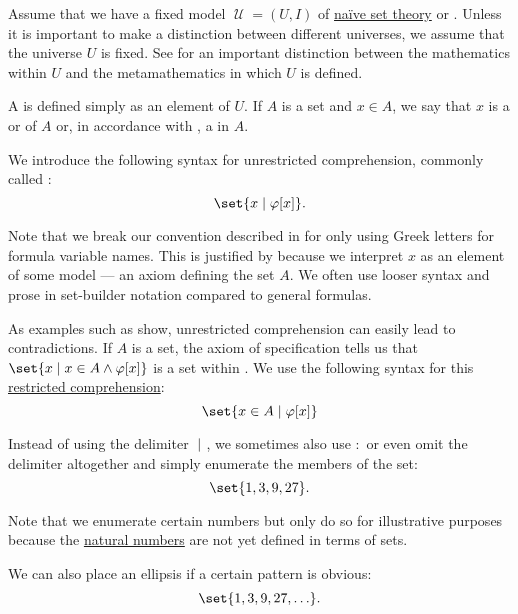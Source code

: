 \begin{definition}\label{def:set}
  Assume that we have a fixed model \( \mscrU = (U, I) \) of \hyperref[def:naive_set_theory]{na\"ive set theory} or \hyperref[def:zfc]{}.  Unless it is important to make a distinction between different universes, we assume that the universe \( U \) is fixed. See  for an important distinction between the mathematics within \( U \) and the metamathematics in which \( U \) is defined.

  A  is defined simply as an element of \( U \). If \( A \) is a set and \( x \in A \), we say that \( x \) is a  or  of \( A \) or, in accordance with , a  in \( A \).
\end{definition}

\begin{definition}\label{def:set_builder_notation}
  We introduce the following syntax for unrestricted comprehension, commonly called :
  \begin{equation*}
    \set{ x \given \varphi[x] }.
  \end{equation*}

  Note that we break our convention described in  for only using Greek letters for formula variable names. This is justified by  because we interpret \( x \) as an element of some model --- an axiom defining the set \( A \). We often use looser syntax and prose in set-builder notation compared to general formulas.

  As examples such as  show, unrestricted comprehension can easily lead to contradictions. If \( A \) is a set, the axiom of specification  tells us that \( \set{ x \given x \in A \wedge \varphi[x] } \) is a set within \hyperref[def:zfc]{}. We use the following syntax for this \hyperref[def:zfc/separation]{restricted comprehension}:
  \begin{equation*}
    \set{ x \in A \given \varphi[x] }
  \end{equation*}

  Instead of using the delimiter \( \given \), we sometimes also use \( : \) or even omit the delimiter altogether and simply enumerate the members of the set:
  \begin{equation*}
    \set{ 1, 3, 9, 27 }.
  \end{equation*}

  Note that we enumerate certain numbers but only do so for illustrative purposes because the \hyperref[def:set_of_natural_numbers]{natural numbers} are not yet defined in terms of sets.

  We can also place an ellipsis if a certain pattern is obvious:
  \begin{equation*}
    \set{ 1, 3, 9, 27, \ldots }.
  \end{equation*}
\end{definition}

